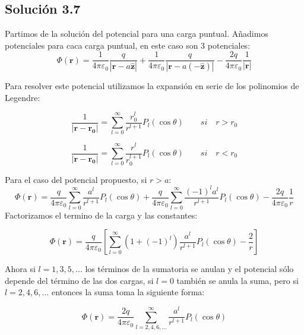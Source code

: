 \documentclass{article}
\begin{document}
\subsection*{Solución 3.7}

Partimos de la solución del potencial para una carga puntual. Añadimos potenciales para caca carga puntual, en este caso son 3 potenciales:
\begin{equation} 
\Phi(\mathbf{r}) = \frac{1}{4\pi\varepsilon_0} \frac{q}{|\mathbf{r} - a \mathbf{\hat{z}}|}  + \frac{1}{4\pi\varepsilon_0} \frac{q}{|\mathbf{r} - a (-\mathbf{\hat{z}})|} - \frac{2q}{4\pi\varepsilon_0}\frac{1}{|\mathbf{r}|}
\end{equation}

Para resolver este potencial utilizamos la expansión en serie de los polinomios de Legendre:


\begin{equation}
    \frac{1}{|\mathbf{r}- \mathbf{r_0}|} = \sum_{l=0}^{\infty} \frac{r_0^l}{r^{l+1}}P_{l}(\cos \theta) \quad \quad si \quad r > r_0
\end{equation}


\begin{equation}
    \frac{1}{|\mathbf{r}- \mathbf{r_0}|} = \sum_{l=0}^{\infty} \frac{r^l}{r_0^{l+1}}P_{l}(\cos \theta) \quad \quad si \quad r < r_0
\end{equation}


Para el caso del potencial propuesto, si $r>a$:
\begin{equation}
    \Phi(\mathbf{r}) = \frac{q}{4\pi\varepsilon_0} \sum_{l=0}^{\infty}\frac{a^l}{r^{l+1}}P_l(\cos \theta) + \frac{q}{4\pi \varepsilon_0}\sum_{l=0}^{\infty} \frac{(-1)^la^l}{r^{l+1}}P_l(\cos \theta) - \frac{2q}{4\pi\varepsilon_0}\frac{1}{r}
\end{equation}
Factorizamos el termino de la carga y las constantes:

\begin{equation}
    \Phi(\mathbf{r}) = \frac{q}{4\pi \varepsilon_0} \left [\sum_{l = 0}^{\infty} (1 + (-1)^l)\frac{a^l}{r^{l+1}}P_l (\cos\theta) - \frac{2}{r} \right]
\end{equation}


Ahora si $l = 1, 3, 5, ...$ los términos de la sumatoria se anulan y el potencial sólo depende del término de las dos cargas, si $l = 0$ también se anula la suma, pero si $l = 2, 4, 6,...$ entonces la suma toma la siguiente forma:


\begin{equation}
    \Phi(\mathbf{r}) = \frac{2q}{4\pi\varepsilon_0} \sum_{l = 2, 4, 6, ...}^{\infty} \frac{a^l}{r^{l+1}}P_l(\cos \theta)
\end{equation}
\end{document}

